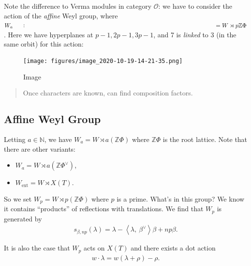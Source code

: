 \begin{example}
\begin{example}
Note the difference to Verma modules in category \({\mathcal{O}}\): we
have to consider the action of the \emph{affine} Weyl group, where
\(W_a \mathrel{\vcenter{:}}= W \rtimes p{\mathbb{Z}}\Phi\). Here we have
hyperplanes at \(p-1, 2p-1, 3p-1\), and 7 is \emph{linked} to 3 (in the
same orbit) for this action:

\begin{figure}
\centering
\texttt{[image: figures/image\_2020-10-19-14-21-35.png]}
\caption{Image}
\end{figure}

\end{example}

\end{example}

\begin{quote}
Once characters are known, can find composition factors.
\end{quote}

\hypertarget{affine-weyl-group}{%
\subsection{Affine Weyl Group}\label{affine-weyl-group}}

Letting \(a\in {\mathbb{N}}\), we have
\(W_a = W\rtimes a({\mathbb{Z}}\Phi)\) where \({\mathbb{Z}}\Phi\) is the
root lattice. Note that there are other variants:

\begin{itemize}
\tightlist
\item
  \(W_a = W\rtimes a({\mathbb{Z}}\Phi^\vee)\),
\item
  \(W_{\text{ext}} = W \rtimes X(T)\).
\end{itemize}

So we set \(W_p = W\rtimes p({\mathbb{Z}}\Phi)\) where \(p\) is a prime.
What's in this group? We know it contains ``products'' of reflections
with translations. We find that \(W_p\) is generated by
\begin{align*}   s_{\beta, np}(\lambda) = \lambda - {\left\langle {\lambda},~{\beta^\vee} \right\rangle}\beta + np \beta .\end{align*}

It is also the case that \(W_p\) acts on \(X(T)\) and there exists a dot
action
\begin{align*}   w\cdot \lambda = w(\lambda + \rho) - \rho .\end{align*}

